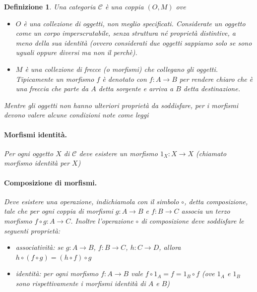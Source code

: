 \documentclass[12pt]{article}
\newtheorem{definition}{Definizione}[section]
\begin{document}
\begin{definition}
Una \emph{categoria} $\mathcal{C}$ è una coppia $(O, M)$ ove

\begin{itemize}
  \item $O$ è una collezione di \emph{oggetti}, non meglio specificati. Considerate un oggetto come un corpo imperscrutabile,
  senza struttura né proprietà distintive, a meno della sua identità (ovvero considerati due oggetti sappiamo solo se sono uguali oppure diversi
  ma non il perchè).
  \item $M$ è una collezione di \emph{frecce} (o \emph{morfismi}) che collegano gli oggetti. Tipicamente un morfismo $f$ è denotato con $f: A \rightarrow B$
  per rendere chiaro che è una freccia che parte da $A$ detta \emph{sorgente} e arriva a $B$ detta \emph{destinazione}.
\end{itemize}

Mentre gli oggetti non hanno ulteriori proprietà da soddisfare, per i morfismi devono valere alcune condizioni note come \emph{leggi}\\

\paragraph{Morfismi identità.} Per ogni oggetto $X$ di $\mathcal{C}$ deve esistere un morfismo $1_X: X \rightarrow X$ (chiamato \emph{morfismo identità per $X$})\\

\paragraph{Composizione di morfismi.} Deve esistere una operazione, indichiamola con il simbolo $\circ$, detta \emph{composizione}, tale che per ogni coppia di morfismi $g: A \rightarrow B$
e $f: B \rightarrow C$ associa un terzo morfismo $f \circ g: A \rightarrow C$. Inoltre l'operazione $\circ$ di composizione deve soddisfare le seguenti proprietà:

\begin{itemize}
  \item associatività: se $g: A \rightarrow B$, $f: B \rightarrow C$, $h: C \rightarrow D$, allora $h \circ (f \circ g) = (h \circ f) \circ g$
  \item identità: per ogni morfismo $f: A \rightarrow B$ vale $f \circ 1_A = f = 1_B \circ f$ (ove $1_A$ e $1_B$ sono rispettivamente i morfismi identità di $A$ e $B$)
\end{itemize}

\end{definition}
\end{document}
